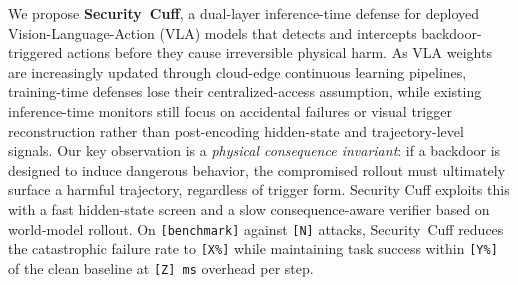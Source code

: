 We propose \textbf{Security~Cuff}, a dual-layer inference-time defense
for deployed Vision-Language-Action (VLA) models that detects and
intercepts backdoor-triggered actions before they cause irreversible
physical harm.
As VLA weights are increasingly updated through cloud-edge continuous
learning pipelines, training-time defenses lose their
centralized-access assumption, while existing inference-time monitors
still focus on accidental failures or visual trigger reconstruction
rather than post-encoding hidden-state and trajectory-level signals.
Our key observation is a \emph{physical consequence invariant}: if a
backdoor is designed to induce dangerous behavior, the compromised
rollout must ultimately surface a harmful trajectory, regardless of
trigger form.
Security Cuff exploits this with a fast hidden-state screen and a slow
consequence-aware verifier based on world-model rollout.
On \texttt{[benchmark]} against \texttt{[N]} attacks,
Security~Cuff reduces the catastrophic failure rate to
\texttt{[X\%]} while maintaining task success within
\texttt{[Y\%]} of the clean baseline at \texttt{[Z]\,ms}
overhead per step.
